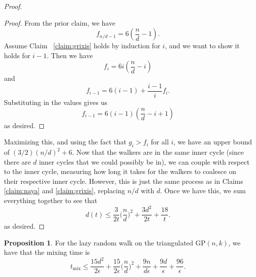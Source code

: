 \documentclass[10pt,a4paper]{amsart}
\theoremstyle{definition}
\numberwithin{definition}{section}
\newtheorem{proposition}[definition]{Proposition}
\begin{document}
\begin{proof}
\begin{proof}
From the prior claim, we have 
\[f_{n/d-1} = 6\left(\frac{n}{d}-1\right). \]
Assume Claim ~\ref{claim:grixis} holds by induction for $i$, and we want to show it holds for $i-1$. Then we have 
\[ f_i = 6i\left(\frac{n}{d}-i\right)\]
and
\[ f_{i-1} = 6(i-1) + \frac{i-1}{i} f_i.\]
Substituting in the values gives us 
\[f_{i-1} = 6(i-1)\left(\frac{n}{d}-i+1\right) \]
as desired.
\end{proof}

Maximizing this, and using the fact that $g_i > f_i$ for all $i$, we have an upper bound of $(3/2)(n/d)^2+6.$ Now that the walkers are in the same inner cycle (since there are $d$ inner cycles that we could possibly be in), we can couple with respect to the inner cycle, measuring how long it takes for the walkers to coalesce on their respective inner cycle. However, this is just the same process as in Claims \ref{claim:naya} and \ref{claim:grixis}, replacing $n/d$ with $d$. Once we have this, we sum everything together to see that 
\[d(t) \leq \frac{3}{2t}\bigg(\frac{n}{d}\bigg)^2 + \frac{3d^2}{2t} + \frac{18}{t}.\]
as desired.
\end{proof}


\begin{proposition}\label{prop:sf}
For the lazy random walk on the triangulated $\text{GP}(n,k)$, we have that the mixing time is 
\[t_{\text{mix}} \leq \frac{15 d^2}{2\epsilon} + \frac{15}{2\epsilon} \bigg( \frac{n}{d}\bigg)^2 + \frac{9n}{d\epsilon} + \frac{9 d}{\epsilon} + \frac{96}{\epsilon}. \]
\end{proposition}
\end{document}
